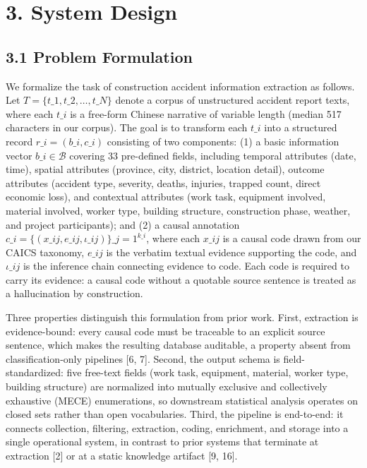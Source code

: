 \documentclass[11pt]{article}
\begin{document}
\section{3. System Design}
\subsection{3.1 Problem Formulation}
We formalize the task of construction accident information extraction as follows. Let $T = \{t\_1, t\_2, \dots, t\_N\}$ denote a corpus of unstructured accident report texts, where each $t\_i$ is a free-form Chinese narrative of variable length (median 517 characters in our corpus). The goal is to transform each $t\_i$ into a structured record $r\_i = (b\_i, c\_i)$ consisting of two components: (1) a basic information vector $b\_i \in \mathcal{B}$ covering $33$ pre-defined fields, including temporal attributes (date, time), spatial attributes (province, city, district, location detail), outcome attributes (accident type, severity, deaths, injuries, trapped count, direct economic loss), and contextual attributes (work task, equipment involved, material involved, worker type, building structure, construction phase, weather, and project participants); and (2) a causal annotation $c\_i = \{(x\_{ij}, e\_{ij}, \iota\_{ij})\}\_{j=1}^{k\_i}$, where each $x\_{ij}$ is a causal code drawn from our CAICS taxonomy, $e\_{ij}$ is the verbatim textual evidence supporting the code, and $\iota\_{ij}$ is the inference chain connecting evidence to code. Each code is required to carry its evidence: a causal code without a quotable source sentence is treated as a hallucination by construction.

Three properties distinguish this formulation from prior work. First, extraction is evidence-bound: every causal code must be traceable to an explicit source sentence, which makes the resulting database auditable, a property absent from classification-only pipelines [6, 7]. Second, the output schema is field-standardized: five free-text fields (work task, equipment, material, worker type, building structure) are normalized into mutually exclusive and collectively exhaustive (MECE) enumerations, so downstream statistical analysis operates on closed sets rather than open vocabularies. Third, the pipeline is end-to-end: it connects collection, filtering, extraction, coding, enrichment, and storage into a single operational system, in contrast to prior systems that terminate at extraction [2] or at a static knowledge artifact [9, 16].
\end{document}

